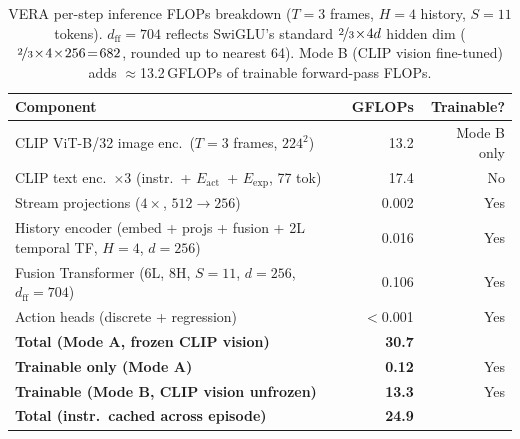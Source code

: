 \documentclass{article}
\newcommand{\Lact}{$E_{\mathrm{act}}$\xspace}
\newcommand{\Lexp}{$E_{\mathrm{exp}}$\xspace}
\begin{document}
\begin{table}[h]
\centering
\caption{VERA per-step inference FLOPs breakdown ($T{=}3$ frames, $H{=}4$ history, $S{=}11$ tokens).
         $d_{\mathrm{ff}}{=}704$ reflects SwiGLU's standard $\nicefrac{2}{3}\!\times\!4d$ hidden dim
         ($\nicefrac{2}{3}\!\times\!4\!\times\!256\!=\!682$, rounded up to nearest 64).
         Mode B (CLIP vision fine-tuned) adds ${\approx}$13.2\,GFLOPs of trainable forward-pass FLOPs.}
\label{tab:flops}
\small
\begin{tabular}{lrr}
\toprule
\textbf{Component} & \textbf{GFLOPs} & \textbf{Trainable?} \\
\midrule
CLIP ViT-B/32 image enc.\ ($T{=}3$ frames, $224^2$) & 13.2  & Mode B only  \\
CLIP text enc.\ $\times3$ (instr.\ + \Lact\ + \Lexp, 77 tok) & 17.4  & No  \\
\midrule
Stream projections ($4\times$, $512\!\to\!256$)  & 0.002 & Yes \\
History encoder (embed + projs + fusion + 2L temporal TF, $H{=}4$, $d{=}256$) & 0.016 & Yes \\
Fusion Transformer (6L, 8H, $S{=}11$, $d{=}256$, $d_{\mathrm{ff}}{=}704$) & 0.106 & Yes \\
Action heads (discrete + regression)             & $<$0.001 & Yes \\
\midrule
\textbf{Total (Mode A, frozen CLIP vision)}          & \textbf{30.7}  &     \\
\textbf{Trainable only (Mode A)}                     & \textbf{0.12}  & Yes \\
\textbf{Trainable (Mode B, CLIP vision unfrozen)}    & \textbf{13.3}  & Yes \\
\textbf{Total (instr.\ cached across episode)}       & \textbf{24.9} & \\
\bottomrule
\end{tabular}
\end{table}
\end{document}
